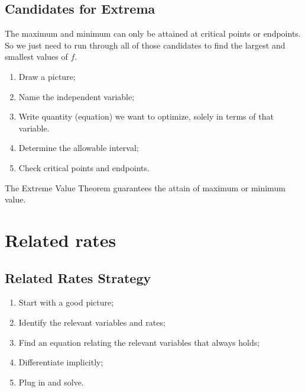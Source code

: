 \subsection{Candidates for Extrema}

The maximum and minimum can only be attained at critical points or endpoints. So we just need to run through all of those candidates to find the largest and smallest values of $f$.
\begin{note}\leavevmode
  \begin{enumerate}
  \item Draw a picture;
  \item Name the independent variable;
  \item Write quantity (equation) we want to optimize, solely in terms of that variable.
  \item Determine the allowable interval;
  \item Check critical points and endpoints.
  \end{enumerate}
\end{note}
\begin{note}
The Extreme Value Theorem guarantees the attain of maximum or minimum value.
\end{note}

\section{Related rates}
\subsection{Related Rates Strategy}
\begin{enumerate}
\item Start with a good picture;
\item Identify the relevant variables and rates;
\item Find an equation relating the relevant variables that always holds;
\item Differentiate implicitly;
\item Plug in and solve.
\end{enumerate}
